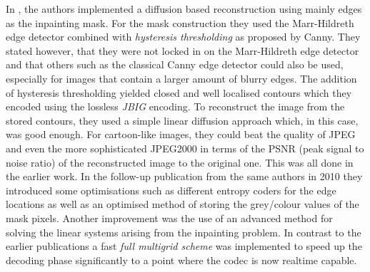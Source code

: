 In \cite{mainberger09, mainberger10}, the authors implemented a diffusion based reconstruction
using mainly edges as the inpainting mask. For the mask construction they used the Marr-Hildreth
edge detector combined with \textit{hysteresis thresholding} as proposed by Canny\cite{canny86}.
They stated however, that they were not locked in on the Marr-Hildreth edge detector and that
others such as the classical Canny edge detector could also be used, especially for images that
contain a larger amount of blurry edges. The addition of hysteresis thresholding yielded closed and
well localised contours which they encoded using the lossless \textit{JBIG} encoding\cite{jbig}.
To reconstruct the image from the stored contours, they used a simple linear diffusion approach
which, in this case, was good enough. For cartoon-like images, they could beat the quality of
JPEG and even the more sophisticated JPEG2000 in terms of the PSNR (peak signal to noise ratio) of the reconstructed image to the
original one. This was all done in the earlier work\cite{mainberger09}. In the follow-up
publication from the same authors in 2010 they introduced some optimisations such as different
entropy coders for the edge locations as well as an optimised method of storing the grey/colour
values of the mask pixels. Another improvement was the use of an advanced method for solving the
linear systems arising from the inpainting problem. In contrast to the earlier publications a fast
\textit{full multigrid scheme} was implemented to speed up the decoding phase significantly to 
a point where the codec is now realtime capable.\\

